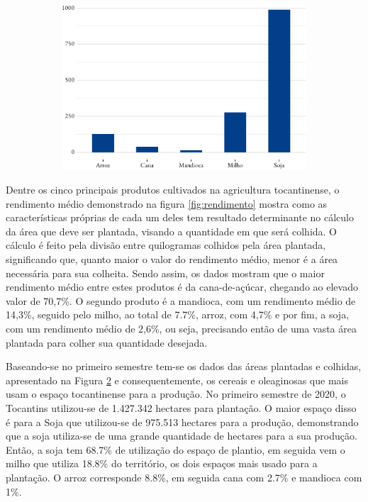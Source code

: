 \begin{figure}[!h]
\begin{subfigure}{\linewidth}
		\includegraphics{fig/area_plantada-1.pdf}
		\label{fig:areaplantada}
	\end{subfigure}
\end{figure}

\par Dentre os cinco principais produtos cultivados na agricultura tocantinense, o rendimento médio demonstrado na figura \ref{fig:rendimento} mostra como as características próprias de cada um deles tem resultado determinante no cálculo da área que deve ser plantada, visando a quantidade em que será colhida. O cálculo é feito pela divisão entre quilogramas colhidos pela área plantada, significando que, quanto maior o valor do rendimento médio, menor é a área necessária para sua colheita. Sendo assim, os dados mostram que o maior rendimento médio entre estes produtos é da cana-de-açúcar, chegando ao elevado valor de 70,7\%. O segundo produto é a mandioca, com um rendimento médio de 14,3\%, seguido pelo milho, ao total de 7.7\%, arroz, com 4,7\% e por fim, a soja, com um rendimento médio de 2,6\%, ou seja, precisando então de uma vasta área plantada para colher sua quantidade desejada.


\par Baseando-se no primeiro semestre tem-se os dados das áreas plantadas e colhidas, apresentado na Figura \ref{fig:areaplantada} e consequentemente, os cereais e oleaginosas que mais usam o espaço tocantinense para a produção. No primeiro semestre de 2020, o Tocantins utilizou-se de 1.427.342 hectares para plantação. O maior espaço disso é para a Soja que utilizou-se de 975.513 hectares para a produção, demonstrando que a soja utiliza-se de uma grande quantidade de hectares para a sua produção. Então, a soja tem 68.7\% de utilização do espaço de plantio, em seguida vem o milho que utiliza 18.8\% do território, os dois espaços mais usado para a plantação. O arroz corresponde 8.8\%, em seguida cana com 2.7\% e mandioca com 1\%.

